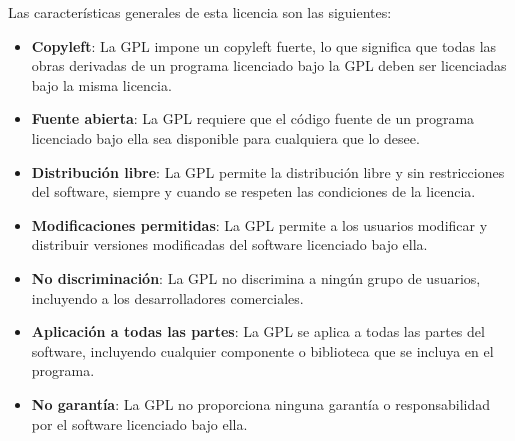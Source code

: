 Las características generales de esta licencia son las siguientes:
\begin{itemize}
    \item \textbf{Copyleft}: La GPL impone un copyleft fuerte, lo que significa que todas las obras derivadas de un programa licenciado bajo la GPL deben ser licenciadas bajo la misma licencia.
    \item \textbf{Fuente abierta}: La GPL requiere que el código fuente de un programa licenciado bajo ella sea disponible para cualquiera que lo desee.
    \item \textbf{Distribución libre}: La GPL permite la distribución libre y sin restricciones del software, siempre y cuando se respeten las condiciones de la licencia.
    \item \textbf{Modificaciones permitidas}: La GPL permite a los usuarios modificar y distribuir versiones modificadas del software licenciado bajo ella.
    \item \textbf{No discriminación}: La GPL no discrimina a ningún grupo de usuarios, incluyendo a los desarrolladores comerciales.
    \item \textbf{Aplicación a todas las partes}: La GPL se aplica a todas las partes del software, incluyendo cualquier componente o biblioteca que se incluya en el programa.
    \item \textbf{No garantía}: La GPL no proporciona ninguna garantía o responsabilidad por el software licenciado bajo ella.
\end{itemize}

\cite{wiki:gpl}
 



